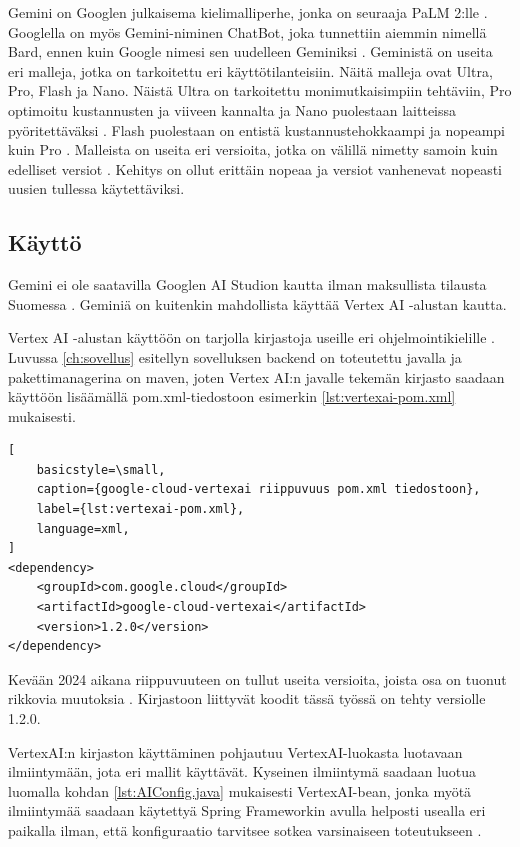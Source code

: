 Gemini on Googlen julkaisema kielimalliperhe, jonka on seuraaja PaLM 2:lle
\parencite{googleKeynote2023}. Googlella on myös Gemini-niminen ChatBot, joka
tunnettiin aiemmin nimellä Bard, ennen kuin Google nimesi sen uudelleen
Geminiksi \parencite{geminiUpdates}. Geministä on useita eri malleja, jotka on
tarkoitettu eri käyttötilanteisiin. Näitä malleja ovat Ultra, Pro, Flash ja
Nano. \parencite{googleDeepmindGemini} Näistä Ultra on tarkoitettu
monimutkaisimpiin tehtäviin, Pro optimoitu kustannusten ja viiveen kannalta ja
Nano puolestaan laitteissa pyöritettäväksi
\parencite{googleDeepmindGeminiv1report}. Flash puolestaan on entistä
kustannustehokkaampi ja nopeampi kuin Pro \parencite{googleKeynote2024}.
Malleista on useita eri versioita, jotka on välillä nimetty samoin kuin
edelliset versiot \parencite{googleDeepmindGeminiv1_5report}. Kehitys on ollut
erittäin nopeaa ja versiot vanhenevat nopeasti uusien tullessa käytettäviksi.

\subsection{Käyttö}

Gemini ei ole saatavilla Googlen AI Studion kautta ilman maksullista tilausta
Suomessa \parencite{googleAiAvailableRegions}. Geminiä on kuitenkin mahdollista
käyttää Vertex AI -alustan kautta.

Vertex AI -alustan käyttöön on tarjolla kirjastoja useille eri
ohjelmointikielille \parencite{vertexAiGenerativeAiQuickstart}. Luvussa
\ref{ch:sovellus} esitellyn sovelluksen backend on toteutettu javalla ja
pakettimanagerina on maven, joten Vertex AI:n javalle tekemän kirjasto saadaan
käyttöön lisäämällä pom.xml-tiedostoon esimerkin \ref{lst:vertexai-pom.xml}
mukaisesti.

\begin{lstlisting}[
    basicstyle=\small,
    caption={google-cloud-vertexai riippuvuus pom.xml tiedostoon},
    label={lst:vertexai-pom.xml},
    language=xml,
]
<dependency>
    <groupId>com.google.cloud</groupId>
    <artifactId>google-cloud-vertexai</artifactId>
    <version>1.2.0</version>
</dependency>
\end{lstlisting}

Kevään 2024 aikana riippuvuuteen on tullut useita versioita, joista osa on
tuonut rikkovia muutoksia \parencite{mavenGoogleVertexAIAPI}. Kirjastoon
liittyvät koodit tässä työssä on tehty versiolle 1.2.0.

VertexAI:n kirjaston käyttäminen pohjautuu VertexAI-luokasta luotavaan
ilmiintymään, jota eri mallit käyttävät. Kyseinen ilmiintymä saadaan luotua
luomalla kohdan \ref{lst:AIConfig.java} mukaisesti VertexAI-bean, jonka myötä
ilmiintymää saadaan käytettyä Spring Frameworkin avulla helposti usealla eri
paikalla ilman, että konfiguraatio tarvitsee sotkea varsinaiseen toteutukseen
\parencite{baeldungSpringBean}.


